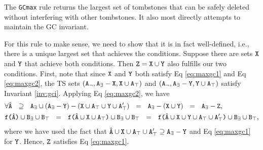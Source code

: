 \documentclass[10pt]{proc}
\renewcommand{\tt}[1]{\ifmmode\text{\texttt{#1}}\else\texttt{#1}\fi}
\begin{document}
The \tt{GCmax} rule returns the largest set of tombstones that can be safely deleted without interfering with other tombstones.
It also most directly attempts to maintain the GC invariant.

For this rule to make sense, we need to show that it is in fact well-defined, i.e., there is a unique largest set that achieves the conditions.
Suppose there are sets $\tt{X}$ and $\tt{Y}$ that achieve both conditions.
Then $\tt{Z} = \tt{X} \cup \tt{Y}$ also fulfills our two conditions.
First, note that since $\tt{X}$ and $\tt{Y}$ both satisfy Eq \eqref{eq:maxgc1} and Eq \eqref{eq:maxgc2}, the TS sets $(\tt{A}_\neg, \tt{A}_\exists - \tt{X}, \tt{X} \cup \tt{A}_\top)$ and $(\tt{A}_\neg, \tt{A}_\exists - \tt{Y}, \tt{Y} \cup \tt{A}_\top)$ satisfy Invariant \ref{inv:gci}.
Applying Eq \eqref{eq:maxgc2}, we have
\begin{align*}
&\forall\hat{\tt{A}}
  ~~\supseteq~~ \tt{A}_\exists \cup (\tt{A}_\exists - \tt{Y}) - (\tt{X} \cup \tt{A}_\top \cup \tt{Y} \cup \tt{A}_\top')
  ~~=~~ \tt{A}_\exists - (\tt{X} \cup \tt{Y})
  ~~=~~ \tt{A}_\exists - \tt{Z},\\
&\tt{f($\hat{\tt{A}}$)} \cup \tt{B}_\exists \cup \tt{B}_\top
  ~~=~~ \tt{f($\hat{\tt{A}} \cup \tt{X} \cup \tt{A}_\top$)} \cup \tt{B}_\exists \cup \tt{B}_\top
  ~~=~~ \tt{f($\hat{\tt{A}} \cup \tt{X} \cup \tt{Y} \cup \tt{A}_\top \cup \tt{A}_\top'$)} \cup \tt{B}_\exists \cup \tt{B}_\top,
\end{align*}
where we have used the fact that $\hat{\tt{A}} \cup \tt{X} \cup \tt{A}_\top \cup \tt{A}_\top' \supseteq \tt{A}_\exists - \tt{Y}$ and Eq \eqref{eq:maxgc1} for $\tt{Y}$.
Hence, $\tt{Z}$ satisfies Eq \eqref{eq:maxgc1}.
\end{document}
